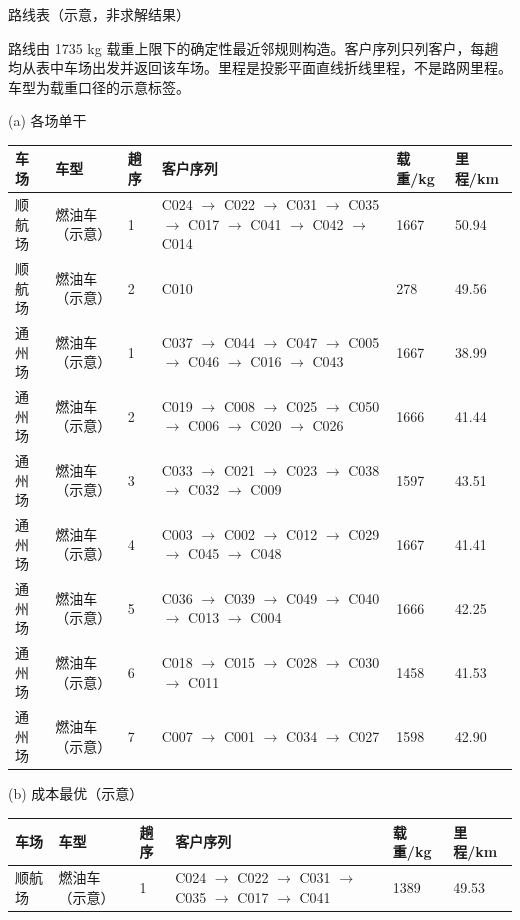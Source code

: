 \documentclass{article}
\begin{document}
\begin{center}
{\sffamily\fontsize{9pt}{11pt}\selectfont 路线表（示意，非求解结果）}
\end{center}
{\fontsize{8pt}{10pt}\selectfont
路线由 1735 kg 载重上限下的确定性最近邻规则构造。客户序列只列客户，每趟均从表中车场出发并返回该车场。里程是投影平面直线折线里程，不是路网里程。车型为载重口径的示意标签。
\par\medskip
{\sffamily (a) 各场单干}\par\smallskip
\noindent\begin{tabular}{@{}L{1.25cm}L{1.55cm}R{0.55cm}L{5.65cm}R{1.05cm}R{1.05cm}@{}}
\toprule
车场 & 车型 & 趟序 & 客户序列 & 载重/kg & 里程/km \\
\midrule
顺航场 & 燃油车（示意） & 1 & C024 $\to$ C022 $\to$ C031 $\to$ C035 $\to$ C017 $\to$ C041 $\to$ C042 $\to$ C014 & 1667 & 50.94 \\
顺航场 & 燃油车（示意） & 2 & C010 & 278 & 49.56 \\
通州场 & 燃油车（示意） & 1 & C037 $\to$ C044 $\to$ C047 $\to$ C005 $\to$ C046 $\to$ C016 $\to$ C043 & 1667 & 38.99 \\
通州场 & 燃油车（示意） & 2 & C019 $\to$ C008 $\to$ C025 $\to$ C050 $\to$ C006 $\to$ C020 $\to$ C026 & 1666 & 41.44 \\
通州场 & 燃油车（示意） & 3 & C033 $\to$ C021 $\to$ C023 $\to$ C038 $\to$ C032 $\to$ C009 & 1597 & 43.51 \\
通州场 & 燃油车（示意） & 4 & C003 $\to$ C002 $\to$ C012 $\to$ C029 $\to$ C045 $\to$ C048 & 1667 & 41.41 \\
通州场 & 燃油车（示意） & 5 & C036 $\to$ C039 $\to$ C049 $\to$ C040 $\to$ C013 $\to$ C004 & 1666 & 42.25 \\
通州场 & 燃油车（示意） & 6 & C018 $\to$ C015 $\to$ C028 $\to$ C030 $\to$ C011 & 1458 & 41.53 \\
通州场 & 燃油车（示意） & 7 & C007 $\to$ C001 $\to$ C034 $\to$ C027 & 1598 & 42.90 \\
\bottomrule
\end{tabular}
\par\medskip
{\sffamily (b) 成本最优（示意）}\par\smallskip
\noindent\begin{tabular}{@{}L{1.25cm}L{1.55cm}R{0.55cm}L{5.65cm}R{1.05cm}R{1.05cm}@{}}
\toprule
车场 & 车型 & 趟序 & 客户序列 & 载重/kg & 里程/km \\
\midrule
顺航场 & 燃油车（示意） & 1 & C024 $\to$ C022 $\to$ C031 $\to$ C035 $\to$ C017 $\to$ C041 & 1389 & 49.53 \\

\end{tabular}}
\end{document}
